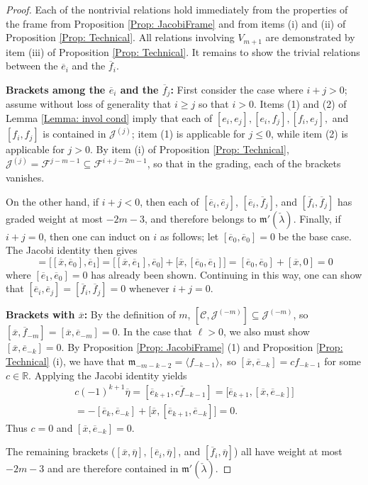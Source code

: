 \documentclass[11pt,letterpaper]{amsart}
\numberwithin{equation}{section}
\newcommand{\oline}{\overline}
\begin{document}
\begin{proof}
    Each of the nontrivial relations hold immediately from the properties of the frame from Proposition \ref{Prop: JacobiFrame} and from items (i) and (ii) of Proposition \ref{Prop: Technical}. All relations involving $V_{m+1}$ are demonstrated by item (iii) of Proposition \ref{Prop: Technical}. It remains to show the trivial relations between the $\oline e_i$ and the $\oline f_i$.

    {\bf Brackets among the $\oline e_i$ and the $\oline f_j$:}
    First consider the case where $i+j>0$; assume without loss of generality that $i\geq j$ so that $i>0$. Items (1) and (2) of Lemma \ref{Lemma: invol cond} imply that each of $[e_i,e_j], [e_i,f_j], [f_i,e_j],$ and $[f_i,f_j]$ is contained in $\mathcal J^{(j)}$; item (1) is applicable for $j\leq 0$, while item (2) is applicable for $j>0$. By item (i) of Proposition \ref{Prop: Technical}, $ \mathcal J^{(j)} = \mathcal F^{j-m-1}\subseteq \mathcal F^{i+j-2m-1}$, so that in the grading, each of the brackets vanishes.
    
    On the other hand, if $i+j<0$, then each of $[\oline e_i,\oline e_j]$, $[\oline e_i,\oline f_j]$, and $[\oline f_i,\oline f_j]$ has graded weight at most $-2m-3$, and therefore belongs to $\mathfrak{m}'(\check\lambda)$. Finally, if $i+j=0$, then one can induct on $i$ as follows; let $[\oline e_0, \oline e_0]=0$ be the base case. The Jacobi identity then gives
    \begin{equation}
        [\oline e_{-1},\oline e_1] = \big[[\oline x, \oline e_0],\oline e_1\big] = \big[[\oline x, \oline e_1],\oline e_0\big] +  \big[\oline x,[\oline e_0,\oline e_1]\big] = [\oline e_0,\oline e_0] + [\oline x, 0] = 0
    \end{equation}
    where $[\oline e_1,\oline e_0]=0$ has already been shown. Continuing in this way, one can show that $[\oline e_i, \oline e_j] = [\oline f_i, \oline f_j] = 0$ whenever $i+j=0$.

    {\bf Brackets with $\oline x$:} By the definition of $m$, $[\mathcal C,\mathcal J^{(-m)}] \subseteq \mathcal J^{(-m)}$, so $[\oline x, \oline f_{-m}]=[\oline x, \oline e_{-m}]=0$. In the case that $\ell>0$, we also must show $[\oline x, \oline e_{-k}] = 0$. By Proposition \ref{Prop: JacobiFrame} (1) and Proposition \ref{Prop: Technical} (i), we have that $\mathfrak m_{-m-k-2} = \langle f_{-k-1}\rangle,$ so $[\oline x, \oline e_{-k}] = cf_{-k-1}$ for some $c\in \mathbb R$. Applying the Jacobi identity yields
    \begin{gather}
        c(-1)^{k+1} \oline \eta = [\oline e_{k+1},c\oline f_{-k-1}] = \big[\oline e_{k+1},[\oline x,\oline e_{-k}]\big] 
        \\
        =-[\oline e_{k},\oline e_{-k}] + \big[\oline x,[\oline e_{k+1},\oline e_{-k}]\big] = 0.
    \end{gather}
    Thus $c= 0$ and $[\oline x, \oline e_{-k}]=0$.

    The remaining brackets ($[\oline x, \oline \eta], [\oline e_i,\oline \eta]$, and $[\oline f_i,\oline \eta]$) all have weight at most $-2m-3$ and are therefore contained in $\mathfrak m'(\check\lambda)$.
\end{proof}
\end{document}
